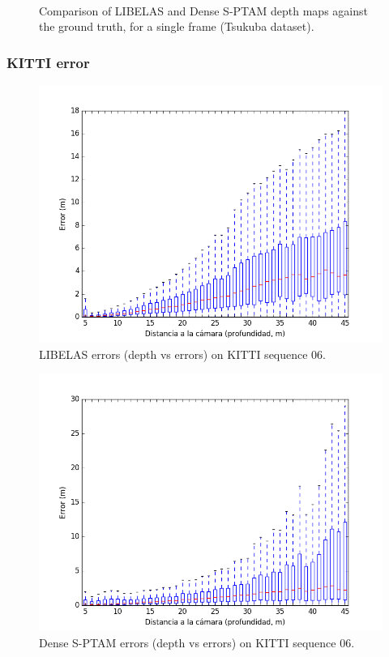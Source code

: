 \documentclass[compress]{beamer}
\begin{document}
\begin{frame}
\begin{figure}[!htb]
{			\label{tsukuba_frame1314_dense}}
		\hfil
		\\
		\caption{Comparison of LIBELAS and Dense S-PTAM depth maps against the ground truth, for a single frame (Tsukuba dataset).}
		\label{fig:tsukuba_frame1314}
	\end{figure}
\end{frame}

\begin{frame}
	\frametitle{KITTI error}
	\begin{figure}[!htb]
		\centering
		\includegraphics[width=0.33\columnwidth]{images/kitti06_libelas_boxplot}
		\caption{LIBELAS errors (depth vs errors) on KITTI sequence 06.}
		\label{fig:kitti06_libelas_boxplot}
	\end{figure}
	
	\begin{figure}[!htb]
		\centering
		\includegraphics[width=0.33\columnwidth]{images/kitti06_dense_boxplot}
		\caption{Dense S-PTAM errors (depth vs errors) on KITTI sequence 06.}
		\label{fig:kitti06_dense_boxplot}
	\end{figure}
\end{frame}
\end{document}
